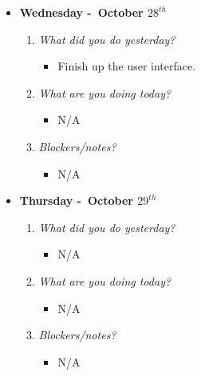 \begin{itemize}
  \item[] \textbf{\large Wednesday -\ October \(28^{th}\)}
  \begin{enumerate}
    \item \textsl{What did you do yesterday?}
    \begin{itemize}
      \item Finish up the user interface.
    \end{itemize}
    \item \textsl{What are you doing today?}
    \begin{itemize}
      \item N/A
    \end{itemize}
    \item \textsl{Blockers/notes?}
    \begin{itemize}
      \item N/A
    \end{itemize}
  \end{enumerate}
\end{itemize}
\textbf{}
\begin{itemize}
  \item[] \textbf{\large Thursday -\ October \(29^{th}\)}
  \begin{enumerate}
    \item \textsl{What did you do yesterday?}
    \begin{itemize}
      \item N/A
    \end{itemize}
    \item \textsl{What are you doing today?}
    \begin{itemize}
      \item N/A
    \end{itemize}
    \item \textsl{Blockers/notes?}
    \begin{itemize}
      \item N/A
    \end{itemize}
  \end{enumerate}
\end{itemize}
\textbf{}
